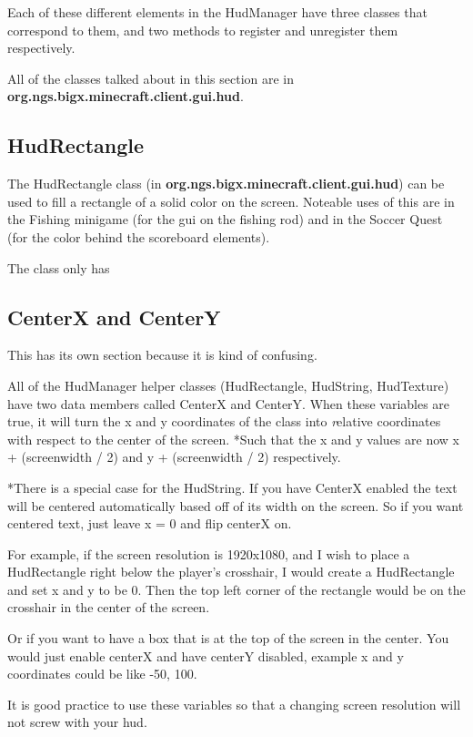\documentclass[12pt]{article}
\begin{document}
Each of these different elements in the HudManager have three classes that correspond to them, and two methods to register and unregister them respectively.

All of the classes talked about in this section are in {\bfseries org.ngs.bigx.minecraft.client.gui.hud}.

\subsection{HudRectangle}

The HudRectangle class (in {\bfseries org.ngs.bigx.minecraft.client.gui.hud}) can be used to fill a rectangle of a solid color on the screen. Noteable uses of this are in the Fishing minigame (for the gui on the fishing rod) and in the Soccer Quest (for the color behind the scoreboard elements).

The class only has 

\subsection{CenterX and CenterY}

This has its own section because it is kind of confusing.

All of the HudManager helper classes (HudRectangle, HudString, HudTexture) have two data members called CenterX and CenterY. When these variables are true, it will turn the x and y coordinates of the class into {\emph relative} coordinates with respect to the center of the screen. *Such that the x and y values are now x + (screenwidth / 2) and y + (screenwidth / 2) respectively.

*There is a special case for the HudString. If you have CenterX enabled the text will be centered automatically based off of its width on the screen. So if you want centered text, just leave x = 0 and flip centerX on.

For example, if the screen resolution is 1920x1080, and I wish to place a HudRectangle right below the player's crosshair, I would create a HudRectangle and set x and y to be 0. Then the top left corner of the rectangle would be on the crosshair in the center of the screen.

Or if you want to have a box that is at the top of the screen in the center. You would just enable centerX and have centerY disabled, example x and y coordinates could be like -50, 100.

It is good practice to use these variables so that a changing screen resolution will not screw with your hud.
\end{document}
